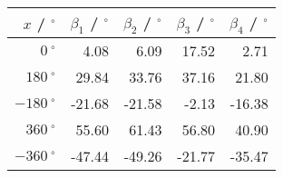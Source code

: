 \begin{tabular}{rrrrr}\\
 $x$ / ${}^\circ$ & $\beta_1$ / ${}^\circ$ & $\beta_2$ / ${}^\circ$ & $\beta_3$ / ${}^\circ$ & $\beta_4$ / ${}^\circ$  \\
 \hline
$0~^\circ$ & 4.08 & 6.09 & 17.52 & 2.71\\
$180~^\circ$ & 29.84 & 33.76 & 37.16 & {\color{red} 21.80}\\
$-180~^\circ$ & {\color{red} -21.68} & {\color{red} -21.58} & -2.13 & -16.38\\
$360~^\circ$ & 55.60 & 61.43 & 56.80 & 40.90\\
$-360~^\circ$ & -47.44 & -49.26 & {\color{red} -21.77} & -35.47
\end{tabular}
